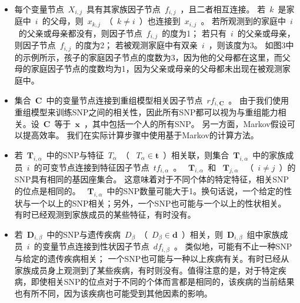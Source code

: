\begin{itemize}
	\item 每个变量节点~$X_{i,j}$~具有其家族因子节点~$f_{i,j}$~，且二者相互连接。 若~$k$~是家庭中~$i$~的父母，则~$x_{k,j}$~（~$k \neq i$~）也连接到~$x_{i,j}$~。 若所观测到的家庭中~$i$~的父亲或母亲都没有，则因子节点~$f_{i,j}$~的度为1； 若只有~$i$~的父亲或母亲，则因子节点~$f_{i,j}$~的度为2； 若被观测家庭中有双亲~$i$~，则该度为3。 如图3中的示例所示，孩子的家庭因子节点的度数为3，因为他的父母都在这里，而父母的家庭因子节点的度数均为1，因为父亲或母亲的父母都未出现在被观测家庭中。
	\item 集合~$\mathbf{C}$~中的变量节点连接到重组模型相关因子节点~$rf_{i,\mathbf{C}}$~。 由于我们使用重组模型来训练SNP之间的相关性，因此所有SNP都可以视为与重组能力相关。设~$\mathbf{C}$~等于~$\mathbf{x}$~，其中包括一个人的所有SNP。 另一方面，Markov假设可以提高效率。 我们在实际计算步骤中使用基于Markov的计算方法。
	\item 若~$\mathbf{T}_{i,\alpha}$~中的SNP与特征~$T_{\alpha}$~（ ~$T_{\alpha} \in \mathbf{t}$~）相关联，则集合~$\mathbf{T}_{i,\alpha}$~中的家族成员~$i$~的可变节点连接到特征因子节点~$tf_{i,\alpha}$~。 ~$\mathbf{T}_{i,\alpha}$~和 ~$\mathbf{T}_{j,\alpha}$~ （~$i \neq j$~）的SNP具有相同的基因座集合。 这意味着对于不同个体的特定特征，相关SNP的位点是相同的。 ~$\mathbf{T}_{i,\alpha}$~中的SNP数量可能大于1。换句话说，一个给定的性状与一个以上的SNP相关；另外，一个SNP也可能与一个以上的性状相关。 有时已经观测到家族成员的某些特征，有时没有。
	\item 若~$\mathbf{D}_{i,\beta}$~中的SNP与遗传疾病~$D_{\beta}$~（~$D_{\beta} \in \mathbf{d}$~）相关，则~$\mathbf{D}_{i,\beta}$~组中家族成员~$i$~的变量节点连接到性状因子节点~$df_{i,\beta}$~。 类似地，可能有不止一种SNP与给定的遗传疾病相关； 一个SNP也可能与一种以上疾病有关。有时已经从家族成员身上观测到了某些疾病，有时则没有。值得注意的是，对于特定疾病，即使相关SNP的位点对于不同的个体而言都是相同的，该疾病的当前结果也有所不同，因为该疾病也可能受到其他因素的影响。
	
\end{itemize}


